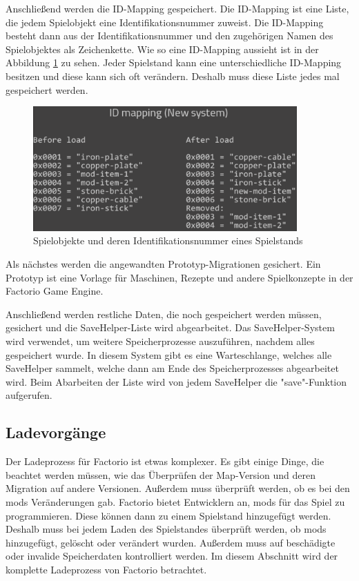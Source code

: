 Anschließend werden die ID-Mapping gespeichert.\cite{factorioGithubSaveLoad} Die ID-Mapping ist eine Liste, die jedem Spielobjekt eine Identifikationsnummer zuweist. Die ID-Mapping besteht dann aus der Identifikationsnummer und den zugehörigen Namen des Spielobjektes als Zeichenkette. Wie so eine ID-Mapping aussieht ist in der Abbildung \ref{fig:factorioIdMapping} zu sehen. Jeder Spielstand kann eine unterschiedliche ID-Mapping besitzen und diese kann sich oft verändern. Deshalb muss diese Liste jedes mal gespeichert werden.\cite{factorioFridayFacts259} 

\begin{figure}[htp]
    \centering
    \includegraphics[width=0.9\textwidth]{images/id_mapping_factorio.png}
    \caption{Spielobjekte und deren Identifikationsnummer eines Spielstands\cite{factorioFridayFacts259}}
    \label{fig:factorioIdMapping}
\end{figure}

Als nächstes werden die angewandten Prototyp-Migrationen gesichert.\cite{factorioGithubSaveLoad} Ein Prototyp ist eine Vorlage für Maschinen, Rezepte und andere Spielkonzepte in der Factorio Game Engine.\cite{factorioPrototypesDocs}

Anschließend werden restliche Daten, die noch gespeichert werden müssen, gesichert und die SaveHelper-Liste wird abgearbeitet. Das SaveHelper-System wird verwendet, um weitere Speicherprozesse auszuführen, nachdem alles gespeichert wurde. In diesem System gibt es eine Warteschlange, welches alle SaveHelper sammelt, welche dann am Ende des Speicherprozesses abgearbeitet wird. Beim Abarbeiten der Liste wird von jedem SaveHelper die "save"-Funktion aufgerufen.\cite{factorioGithubSaveLoad}



\subsection{Ladevorgänge}
Der Ladeprozess für Factorio ist etwas komplexer. Es gibt einige Dinge, die beachtet werden müssen, wie das Überprüfen der Map-Version und deren Migration auf andere Versionen. Außerdem muss überprüft werden, ob es bei den \acp{mod} Veränderungen gab. Factorio bietet Entwicklern an, \acp{mod} für das Spiel zu programmieren. Diese können dann zu einem Spielstand hinzugefügt werden. Deshalb muss bei jedem Laden des Spielstandes überprüft werden, ob \acp{mod} hinzugefügt, gelöscht oder verändert wurden. Außerdem muss auf beschädigte oder invalide Speicherdaten kontrolliert werden.\cite{factorioFridayFacts270} Im diesem Abschnitt wird der komplette Ladeprozess von Factorio betrachtet.

